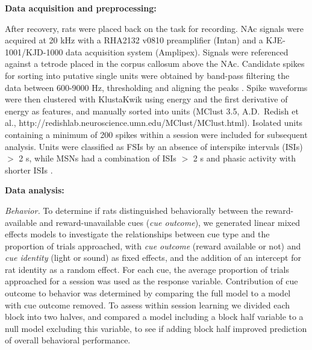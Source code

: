 \documentclass[11pt]{article}
\let\cite=\citep
\begin{document}
{\bf Data acquisition and preprocessing:}

After recovery, rats were placed back on the task for recording. NAc
signals were acquired at 20 kHz with a RHA2132 v0810 preamplifier
(Intan) and a KJE-1001/KJD-1000 data acquisition system
(Amplipex). Signals were referenced against a tetrode placed in the
corpus callosum above the NAc. Candidate spikes for sorting into
putative single units were obtained by band-pass filtering the data
between 600-9000 Hz, thresholding and aligning the peaks \cite[UltraMegaSort2k, ][]{Hill2011}. Spike waveforms were then
clustered with KlustaKwik using energy and the first derivative of
energy as features, and manually sorted into units (MClust 3.5,
A.D.\ Redish et al., http://redishlab.neuroscience.umn.edu/MClust/MClust.html). Isolated units containing a minimum of 200
spikes within a session were included for subsequent analysis. Units
were classified as FSIs by an absence of
interspike intervals (ISIs) $>$ 2 s, while MSNs
had a combination of ISIs $>$ 2 s and phasic activity with shorter
ISIs \cite{Barnes2005,Atallah2014}.

{\bf Data analysis:}

{\it Behavior.} To determine if rats distinguished behaviorally
between the reward-available and reward-unavailable cues ({\it cue
outcome}), we generated linear mixed effects models to investigate
the relationships between cue type and the proportion of trials approached, with
{\it cue outcome} (reward available or not) and {\it cue identity}
(light or sound) as fixed effects, and the addition of an intercept
for rat identity as a random effect. For each cue, the average
proportion of trials approached for a session was
used as the response variable. Contribution of cue outcome to behavior
was determined by comparing the full model to a model with cue outcome
removed. To assess within session learning we divided each block into two halves, and compared a model including a block half variable to a null model excluding this variable, to see if adding block half improved prediction of overall behavioral performance.
\end{document}
